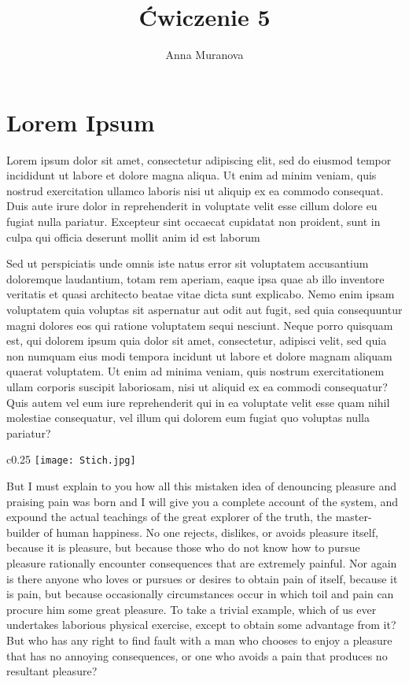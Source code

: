\documentclass[a4paper, 12pt]{amsart}
\author[A. Muranova]{Anna Muranova}
\title{Ćwiczenie 5}
\begin{document}
\maketitle


 

\section{Lorem Ipsum}

Lorem ipsum dolor sit amet, consectetur adipiscing elit, sed do eiusmod tempor incididunt ut labore et dolore magna aliqua. Ut enim ad minim veniam, quis nostrud exercitation ullamco laboris nisi ut aliquip ex ea commodo consequat. Duis aute irure dolor in reprehenderit in voluptate velit esse cillum dolore eu fugiat nulla pariatur. Excepteur sint occaecat cupidatat non proident, sunt in culpa qui officia deserunt mollit anim id est laborum

Sed ut perspiciatis unde omnis iste natus error sit voluptatem accusantium doloremque laudantium, totam rem aperiam, eaque ipsa quae ab illo inventore veritatis et quasi architecto beatae vitae dicta sunt explicabo. Nemo enim ipsam voluptatem quia voluptas sit aspernatur aut odit aut fugit, sed quia consequuntur magni dolores eos qui ratione voluptatem sequi nesciunt. Neque porro quisquam est, qui dolorem ipsum quia dolor sit amet, consectetur, adipisci velit, sed quia non numquam eius modi tempora incidunt ut labore et dolore magnam aliquam quaerat voluptatem. Ut enim ad minima veniam, quis nostrum exercitationem ullam corporis suscipit laboriosam, nisi ut aliquid ex ea commodi consequatur? Quis autem vel eum iure reprehenderit qui in ea voluptate velit esse quam nihil molestiae consequatur, vel illum qui dolorem eum fugiat quo voluptas nulla pariatur?

\begin{wrapfigure}{c}{0.25\textwidth}
\texttt{[image: Stich.jpg]}
\end{wrapfigure}

But I must explain to you how all this mistaken idea of denouncing pleasure and praising pain was born and I will give you a complete account of the system, and expound the actual teachings of the great explorer of the truth, the master-builder of human happiness. No one rejects, dislikes, or avoids pleasure itself, because it is pleasure, but because those who do not know how to pursue pleasure rationally encounter consequences that are extremely painful. Nor again is there anyone who loves or pursues or desires to obtain pain of itself, because it is pain, but because occasionally circumstances occur in which toil and pain can procure him some great pleasure. To take a trivial example, which of us ever undertakes laborious physical exercise, except to obtain some advantage from it? But who has any right to find fault with a man who chooses to enjoy a pleasure that has no annoying consequences, or one who avoids a pain that produces no resultant pleasure?
\end{document}

